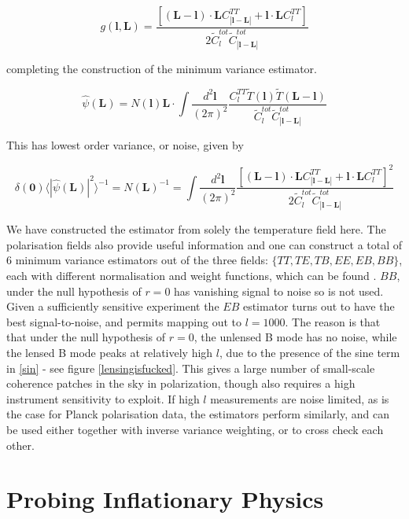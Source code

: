 \documentclass[a4paper,10pt]{article}
\renewcommand{\v}[1]{\mathbf{#1}}
\newcommand{\finttwo}[1]{\int \frac{d^2 \v{#1}}{(2\pi)^2}}
\begin{document}
\begin{equation}
g(\v{l},\v{L}) = \frac{[(\v{L}-\v{l})\cdot\v{L}C^{TT}_{|\v{l}-\v{L}|}+\v{l}\cdot\v{L}C_l^{TT}]}{2\tilde{C}_l^{tot}\tilde{C}_{|\v{l}-\v{L}|}^{tot}}
\end{equation}

completing the construction of the minimum variance estimator. 

\begin{equation}
\hat{\psi}(\v{L}) = N(\v{l})\v{L}\cdot\finttwo{l} \frac{C_l^{TT}\tilde{T}(\v{l})\tilde{T}(\v{L-l})}{\tilde{C}_l^{tot}\tilde{C}_{|\v{l}-\v{L}|}^{tot}}
\end{equation}


This has lowest order variance, or noise, given by


\begin{equation}
\delta(\v{0}) \langle |\hat{\psi}(\v{L})|^2 \rangle^{-1} =  N(\v{L})^{-1} = \finttwo{l}  \frac{[(\v{L}-\v{l})\cdot\v{L}C^{TT}_{|\v{l}-\v{L}|}+\v{l}\cdot\v{L}C_l^{TT}]^2}{2\tilde{C}_l^{tot}\tilde{C}_{|\v{l}-\v{L}|}^{tot}}
\end{equation}

We have constructed the estimator from solely the temperature field here. The polarisation fields also provide useful information and one can construct a total of 6 minimum variance estimators out of the three fields: $\{TT, TE, TB, EE, EB, BB\}$, each with different normalisation and weight functions, which can be found \cite{hu-estimator}. $BB$, under the null hypothesis of $r=0$ has vanishing signal to noise so is not used. Given a sufficiently sensitive experiment the $EB$ estimator turns out to have the best signal-to-noise, and permits mapping out to $l=1000$. The reason is that that under the null hypothesis of $r=0$, the unlensed B mode has no noise, while the lensed B mode peaks at relatively high $l$, due to the presence of the sine term in \ref{sin} - see figure \ref{lensingisfucked}. This gives a large number of small-scale coherence patches in the sky in polarization, though also requires a high instrument sensitivity to exploit. If high $l$ measurements are noise limited, as is the case for Planck polarisation data, the estimators perform similarly, and can be used either together with inverse variance weighting, or to cross check each other.


\newpage
\section{Probing Inflationary Physics}
\end{document}
